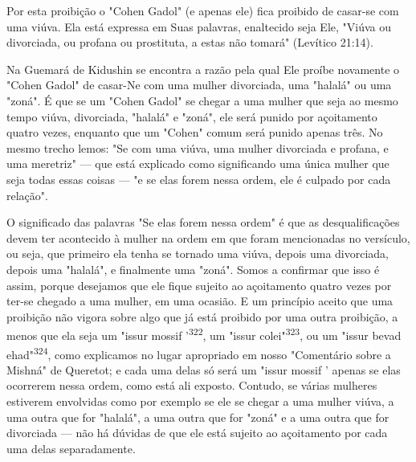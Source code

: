 \begin{itemize}
\begin{enumrate}
\begin{itemize}
\begin{itemize}
\begin{itemize}
Por esta proibição o "Cohen Gadol" (e apenas ele) fica proibido de
ca­sar-se com uma viúva. Ela está expressa em Suas palavras, enaltecido
seja Ele, "Viúva ou divorciada, ou profana ou prostituta, a estas não
tomará" (Levítico 21:14).

Na Guemará de Kidushin se encontra a razão pela qual Ele proíbe
novamente o "Cohen Gadol" de casar-Ne com uma mulher divorciada, uma
"ha­lalá" ou uma "zoná". É que se um "Cohen Gadol" se chegar a uma
mulher que seja ao mesmo tempo viúva, divorciada, "halalá" e "zoná", ele
será puni­do por açoitamento quatro vezes, enquanto que um "Cohen" comum
será pu­nido apenas três. No mesmo trecho lemos: "Se com uma viúva, uma
mulher divorciada e profana, e uma meretriz" --- que está explicado como
significan­do uma única mulher que seja todas essas coisas --- "e se
elas forem nessa or­dem, ele é culpado por cada relação".

O significado das palavras "Se elas forem nessa ordem" é que as
des­qualificações devem ter acontecido à mulher na ordem em que foram
mencio­nadas no versículo, ou seja, que primeiro ela tenha se tornado
uma viúva, de­pois uma divorciada, depois uma "halalá", e finalmente uma
"zoná". Somos a confirmar que isso é assim, porque desejamos que ele
fique sujeito ao açoita­mento quatro vezes por ter-se chegado a uma
mulher, em uma ocasião. E um princípio aceito que uma proibição não
vigora sobre algo que já está proibido por uma outra proibição, a menos
que ela seja um "issur mossif '\textsuperscript{322}, um "is­sur
colei"\textsuperscript{323}, ou um "issur bevad
ehad"\textsuperscript{324}, como explicamos no lugar apro­priado em
nosso "Comentário sobre a Mishná" de Queretot; e cada uma delas só será
um "issur mossif ' apenas se elas ocorrerem nessa ordem, como está ali
exposto. Contudo, se várias mulheres estiverem envolvidas como por
exemplo se ele se chegar a uma mulher viúva, a uma outra que for
"halalá", a uma outra que for "zoná" e a uma outra que for divorciada
--- não há dúvidas de que ele está sujeito ao açoitamento por cada uma
delas separadamente.


\end{itemize}
\end{itemize}
\end{itemize}
\end{enumrate}
\end{itemize}
